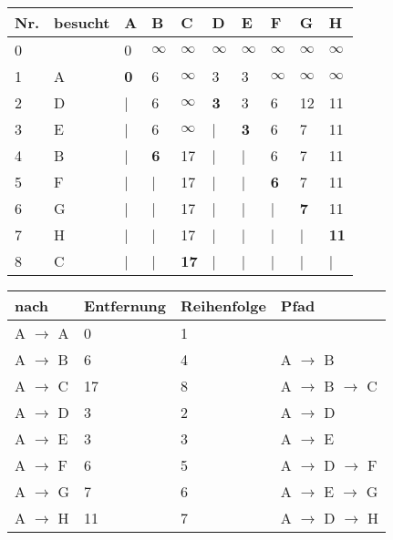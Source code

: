 \documentclass{bschlangaul-aufgabe}
\begin{document}
\begin{tabular}{llllllllll}
\bf{Nr.} & \bf{besucht} & \bf{A} & \bf{B} & \bf{C} & \bf{D} & \bf{E} & \bf{F} & \bf{G} & \bf{H} \\
\hline
0 &   & 0 & $\infty$ & $\infty$ & $\infty$ & $\infty$ & $\infty$ & $\infty$ & $\infty$ \\
1 & A & \bf{0} & 6 & $\infty$ & 3 & 3 & $\infty$ & $\infty$ & $\infty$ \\
2 & D & | & 6 & $\infty$ & \bf{3} & 3 & 6 & 12 & 11 \\
3 & E & | & 6 & $\infty$ & | & \bf{3} & 6 & 7 & 11 \\
4 & B & | & \bf{6} & 17 & | & | & 6 & 7 & 11 \\
5 & F & | & | & 17 & | & | & \bf{6} & 7 & 11 \\
6 & G & | & | & 17 & | & | & | & \bf{7} & 11 \\
7 & H & | & | & 17 & | & | & | & | & \bf{11} \\
8 & C & | & | & \bf{17} & | & | & | & | & | \\
\end{tabular}

\begin{tabular}{llll}
\bf{nach} & \bf{Entfernung} & \bf{Reihenfolge} & \bf{Pfad} \\
\hline
A  $\rightarrow$  A & 0 & 1 &   \\
A  $\rightarrow$  B & 6 & 4 & A $\rightarrow$ B \\
A  $\rightarrow$  C & 17 & 8 & A $\rightarrow$ B $\rightarrow$ C \\
A  $\rightarrow$  D & 3 & 2 & A $\rightarrow$ D \\
A  $\rightarrow$  E & 3 & 3 & A $\rightarrow$ E \\
A  $\rightarrow$  F & 6 & 5 & A $\rightarrow$ D $\rightarrow$ F \\
A  $\rightarrow$  G & 7 & 6 & A $\rightarrow$ E $\rightarrow$ G \\
A  $\rightarrow$  H & 11 & 7 & A $\rightarrow$ D $\rightarrow$ H \\
\end{tabular}
\end{document}
